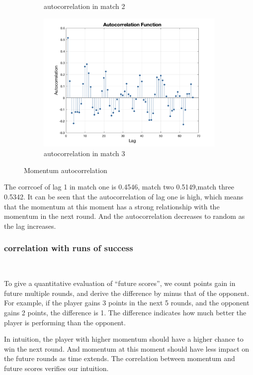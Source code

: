 \begin{figure}[H]
\begin{subfigure}[b]{0.34\textwidth}
        \caption{autocorrelation in match 2}
    \end{subfigure}\hspace{-0.02\textwidth}
    \begin{subfigure}[b]{0.34\textwidth}
        \includegraphics[width=\linewidth]{mainmatter/photos/momen_selfco_3.png}
        \caption{autocorrelation in match 3}
    \end{subfigure}
    \caption{Momentum autocorrelation}
    \label{fig:Correlation}
\end{figure}

The corrcoef of lag 1 in match one is 0.4546, match two 0.5149,match three 0.5342.
It can be seen that the autocorrelation of lag one is high, which means that the momentum at this moment
has a strong relationship with the momentum in the next round. And the autocorrelation decreases to random 
as the lag increases.

\subsubsection{correlation with runs of success}~{}

To give a quantitative evaluation of ``future scores'', we count points gain in future multiple rounds,
and derive the difference by minus that of the opponent. 
For example, if the player gains 3 points in the next 5 rounds, and the opponent gains 2 points,
the difference is 1.
The difference indicates how much better the player is performing than the opponent.

In intuition, the player with higher momentum should have a higher chance to win the next round.
And momentum at this moment should have less impact on the future rounds as time extends.
The correlation between momentum and future scores verifies our intuition.


